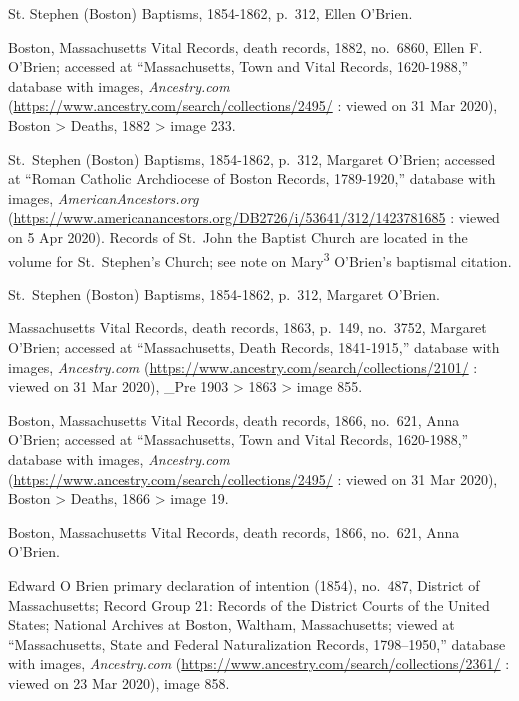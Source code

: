 \begin{thebibliography}{999}
St. Stephen (Boston) Baptisms, 1854-1862, p.\ 312, Ellen O'Brien.

Boston, Massachusetts Vital Records, death records, 1882, no.\ 6860, Ellen F. O'Brien; accessed at ``Massachusetts, Town and Vital Records, 1620-1988,'' database with images, \textit{Ancestry.com} (\url{https://www.ancestry.com/search/collections/2495/} : viewed on 31 Mar 2020), Boston > Deaths, 1882 > image 233.

St.\ Stephen (Boston) Baptisms, 1854-1862, p.\ 312, Margaret O'Brien; accessed at ``Roman Catholic Archdiocese of Boston Records, 1789-1920,'' database with images, \textit{AmericanAncestors.org} (\url{https://www.americanancestors.org/DB2726/i/53641/312/1423781685} : viewed on 5 Apr 2020). Records of St.\ John the Baptist Church are located in the volume for St.\ Stephen's Church; see note on Mary\textsuperscript{3} O'Brien's baptismal citation.

St.\ Stephen (Boston) Baptisms, 1854-1862, p.\ 312, Margaret O'Brien.

Massachusetts Vital Records, death records, 1863, p.\ 149, no.\ 3752, Margaret O'Brien; accessed at ``Massachusetts, Death Records, 1841-1915,'' database with images, \textit{Ancestry.com} (\url{https://www.ancestry.com/search/collections/2101/} : viewed on 31 Mar 2020), \_Pre 1903 > 1863 > image 855.

Boston, Massachusetts Vital Records, death records, 1866, no.\ 621, Anna O'Brien; accessed at ``Massachusetts, Town and Vital Records, 1620-1988,'' database with images, \textit{Ancestry.com} (\url{https://www.ancestry.com/search/collections/2495/} : viewed on 31 Mar 2020), Boston > Deaths, 1866 > image 19.

Boston, Massachusetts Vital Records, death records, 1866, no.\ 621, Anna O'Brien.


Edward O Brien primary declaration of intention (1854), no.\ 487, District of Massachusetts; Record Group 21: Records of the District Courts of the United States; National Archives at Boston, Waltham, Massachusetts; viewed at ``Massachusetts, State and Federal Naturalization Records, 1798--1950,''
database with images, \textit{Ancestry.com} (\url{https://www.ancestry.com/search/collections/2361/} : viewed on 23 Mar 2020), image 858.


\end{thebibliography}
